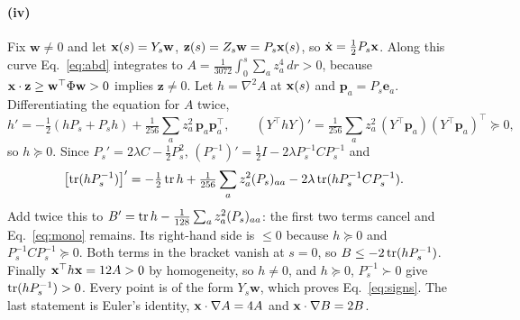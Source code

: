 \paragraph{(iv)}
Fix $\mathbf w\ne0$ and let $\mathbf x(s)=Y_s\mathbf w$, $\mathbf z(s)=Z_s\mathbf w=P_s\mathbf x(s)$, so $\dot{\mathbf x}=\tfrac12P_s\mathbf x$. Along this
curve Eq.~\eqref{eq:abd} integrates to
$A=\tfrac1{3072}\int_0^s\sum_az_a^4\,dr>0$, because $\mathbf x\cdot\mathbf z\ge\mathbf w^\top\Phi\mathbf w>0$ implies
$\mathbf z\ne0$. Let $h=\nabla^2A$ at $\mathbf x(s)$ and $\mathbf p_a=P_s\mathbf e_a$. Differentiating the equation
for $A$ twice,
\[
 h'=-\tfrac12(hP_s+P_sh)+\tfrac1{256}\sum_az_a^2\,\mathbf p_a\mathbf p_a^\top,\qquad
 (Y^\top hY)'=\tfrac1{256}\sum_az_a^2\,(Y^\top\mathbf p_a)(Y^\top\mathbf p_a)^\top\succeq0 ,
\]
so $h\succeq0$. Since $P_s'=2\lambda C-\tfrac12P_s^2$, $(P_s^{-1})'=\tfrac12I-2\lambda P_s^{-1}CP_s^{-1}$ and
\[
 \bigl[\operatorname{tr}(hP_s^{-1})\bigr]'=-\tfrac12\operatorname{tr} h+\tfrac1{256}\sum_az_a^2(P_s)_{aa}
 -2\lambda\operatorname{tr}(hP_s^{-1}CP_s^{-1}).
\]
Add twice this to $B'=\operatorname{tr} h-\tfrac1{128}\sum_az_a^2(P_s)_{aa}$: the first two terms cancel and
Eq.~\eqref{eq:mono} remains. Its right-hand side is $\le0$ because $h\succeq0$ and
$P_s^{-1}CP_s^{-1}\succeq0$. Both terms in the bracket vanish at $s=0$, so
$B\le-2\operatorname{tr}(hP_s^{-1})$. Finally $\mathbf x^\top h\mathbf x=12A>0$ by homogeneity, so $h\ne0$, and
$h\succeq0$, $P_s^{-1}\succ0$ give $\operatorname{tr}(hP_s^{-1})>0$. Every point is of the form $Y_s\mathbf w$, which
proves Eq.~\eqref{eq:signs}. The last statement is Euler's identity,
$\mathbf x\cdot\nabla A=4A$ and $\mathbf x\cdot\nabla B=2B$.\hfill\qedsymbol
